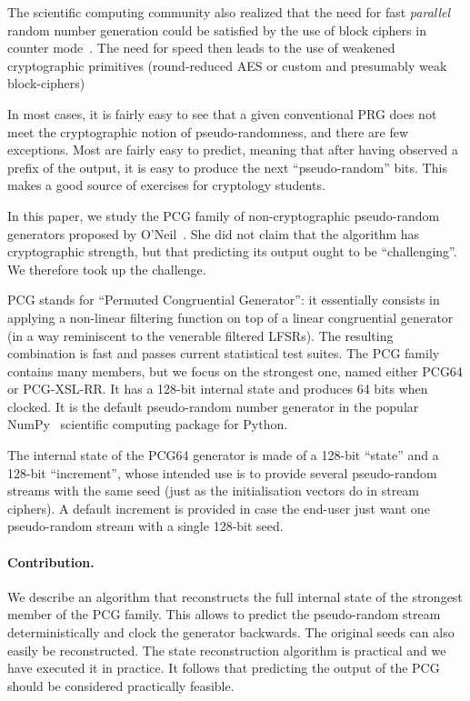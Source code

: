 \documentclass[journal=tosc,final]{iacrtrans}
\begin{document}
The scientific computing community also realized that the need for fast
\emph{parallel} random number generation could be satisfied by the use of block
ciphers in counter mode~\cite{Salmon11}. The need for speed then leads to the
use of weakened cryptographic primitives (round-reduced AES or custom and
presumably weak block-ciphers)

In most cases, it is fairly easy to see that a given conventional PRG does not
meet the cryptographic notion of pseudo-randomness, and there are few
exceptions. Most are fairly easy to predict, meaning that after having observed
a prefix of the output, it is easy to produce the next ``pseudo-random''
bits. This makes a good source of exercises for cryptology students.

In this paper, we study the \textsf{PCG} family of non-cryptographic
pseudo-random generators proposed by O'Neil~\cite{melissapaper,melissaweb}. She
did not claim that the algorithm has cryptographic strength, but that predicting
its output ought to be ``challenging''. We therefore took up the challenge.

\textsf{PCG} stands for ``Permuted Congruential Generator'': it essentially
consists in applying a non-linear filtering function on top of a linear
congruential generator (in a way reminiscent to the venerable filtered
LFSRs). The resulting combination is fast and passes current statistical test
suites. The \textsf{PCG} family contains many members, but we focus on the
strongest one, named either \textsf{PCG64} or \textsf{PCG-XSL-RR}. It has a
128-bit internal state and produces 64 bits when clocked. It is the default
pseudo-random number generator in the popular \textsf{NumPy}~\cite{Numpy}
scientific computing package for \textsf{Python}.

The internal state of the \textsf{PCG64} generator is made of a 128-bit
``state'' and a 128-bit ``increment'', whose intended use is to provide several
pseudo-random streams with the same seed (just as the initialisation vectors do
in stream ciphers). A default increment is provided in case the end-user just
want one pseudo-random stream with a single 128-bit seed.

\paragraph{Contribution.} We describe an algorithm that reconstructs the full
internal state of the strongest member of the \textsf{PCG} family. This allows
to predict the pseudo-random stream deterministically and clock the generator
backwards. The original seeds can also easily be reconstructed. The state
reconstruction algorithm is practical and we have executed it in practice. It
follows that predicting the output of the \textsf{PCG} should be considered
practically feasible.
\end{document}
